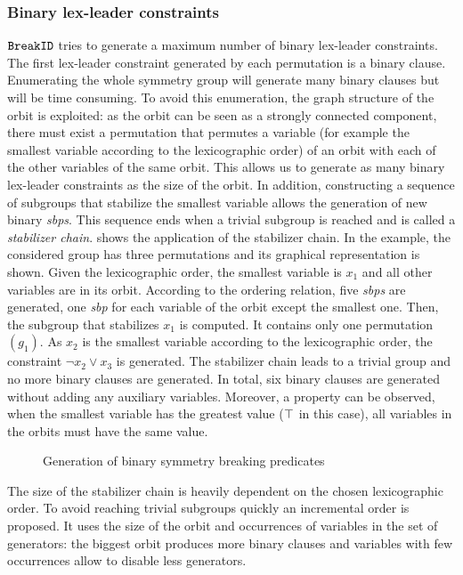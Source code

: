 \subsubsection{Binary lex-leader constraints}
$\texttt{BreakID}$ tries to generate a maximum number of binary lex-leader constraints.
The first lex-leader constraint generated by each permutation is a binary clause.
Enumerating the whole symmetry group will generate many binary clauses but will be time consuming.
To avoid this enumeration, the  graph structure  of the orbit is exploited: as the orbit can be seen as a strongly connected component, there must exist a permutation that permutes a variable (for example the smallest variable according to the lexicographic order) of an orbit with each of the other variables of the same orbit. This allows us to
generate as many binary lex-leader constraints as the size of the orbit. In addition, constructing 
a sequence of subgroups that stabilize the smallest variable allows the generation of new binary \textit{sbps}.
This sequence ends when a trivial subgroup is reached and is called a  \emph{stabilizer chain}.
 shows the application of the stabilizer chain.
In the example, the considered group has three permutations and its graphical representation
is shown. Given the lexicographic order, the smallest variable is $x_1$ and 
all other variables are in its orbit. According to the ordering relation, five 
\textit{sbps} are generated, one \textit{sbp} for each variable of the orbit except the smallest one.
Then, the subgroup that stabilizes $x_1$ is computed. It contains only one permutation $(g_1)$.
As $x_2$ is the smallest variable according to the lexicographic order, the constraint $\neg x_2 \lor x_3$ is generated. The stabilizer chain leads to a trivial group and no more binary clauses are generated.
In total, six binary clauses are generated without adding any auxiliary variables.
Moreover, a property can be observed, when the smallest variable has the greatest value 
($\top$ in this case), all variables in the orbits must have the same value.
 \begin{figure}[!htbp]
 
 \caption{Generation of binary symmetry breaking predicates}
 \label{fig:binary_sbp}
\end{figure}
The size of the stabilizer chain is heavily dependent on the chosen lexicographic order.
To avoid reaching trivial subgroups quickly an incremental order is proposed.
It uses the size of the orbit and occurrences of variables in the set of generators:
the biggest orbit produces more binary clauses and variables with few occurrences allow to disable less generators.


